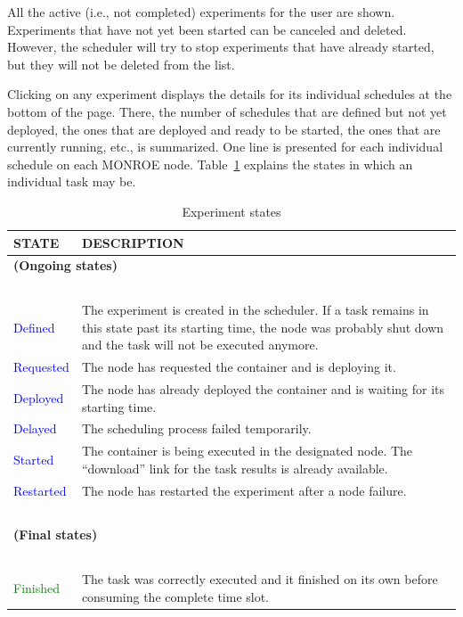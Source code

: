\documentclass[a4paper,10pt]{article}
\newcommand{\monroe}{MONROE}
\begin{document}
All the active (i.e., not completed) experiments for the user are shown.
Experiments that have not yet been started can be canceled and deleted.
However, the scheduler will try to stop experiments that have already started, but they will not be deleted from the list.

Clicking on any experiment displays the details for its individual schedules at the bottom of the page.
There, the number of schedules that are defined but not yet deployed, the ones that are deployed and ready to be started, the ones that are currently running, etc., is summarized.
One line is presented for each individual schedule on each \monroe{} node.
Table~\ref{tab:experimentStates} explains the states in which an individual task may be.

\begin{table}[tp]
	\caption{Experiment states}\label{tab:experimentStates}
	\begin{center}
		\begin{tabular*}{1\textwidth}{p{}p{}}
			\toprule
			\textbf{STATE} & \textbf{DESCRIPTION} \\ \midrule
			\multicolumn{2}{l}{\textbf{(Ongoing states)}}\\~\\
			\textcolor{blue}{Defined} & The experiment is created in the scheduler. If a task remains in this state past its starting time, the node was probably shut down and the task will not be executed anymore.\\
			\textcolor{blue}{Requested} & The node has requested the container and is deploying it.\\
			\textcolor{blue}{Deployed} & The node has already deployed the container and is waiting for its starting time.\\
			\textcolor{blue}{Delayed} & The scheduling process failed temporarily.\\
			\textcolor{blue}{Started} & The container is being executed in the designated node. The ``download'' link for the task results is already available.\\
			\textcolor{blue}{Restarted} & The node has restarted the experiment after a node failure.\\~\\
			\midrule
			\multicolumn{2}{l}{\textbf{(Final states)}}\\~\\
			\textcolor{green}{Finished} & The task was correctly executed and it finished on its own before consuming the complete time slot.\\

\end{tabular*}
\end{center}
\end{table}
\end{document}
